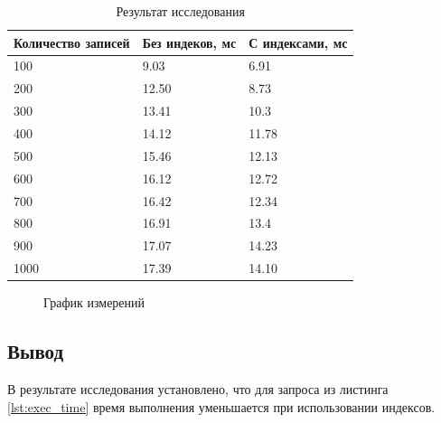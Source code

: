 \begin{table}[ht!]
	\centering
	\caption{Результат исследования}
	\label{tab:measure}
	\begin{tabular}{|p{4cm}|p{5cm}|p{5cm}|}
		\hline
		\textbf{Количество записей} & \textbf{Без индеков, мс} & \textbf{С индексами, мс} \\
		\hline
		100 & 9.03 & 6.91 \\
		\hline
		200 & 12.50 & 8.73 \\
		\hline
		300 & 13.41 & 10.3 \\
		\hline
		400 & 14.12 & 11.78 \\
		\hline
		500 & 15.46 & 12.13 \\
		\hline
		600 & 16.12 & 12.72 \\
		\hline
		700 & 16.42 & 12.34 \\
		\hline
		800 & 16.91 & 13.4 \\
		\hline
		900 & 17.07 & 14.23 \\
		\hline
		1000 & 17.39 & 14.10 \\
		\hline
	\end{tabular}
\end{table}

\begin{figure}[h!]
	\caption{График измерений}
	\label{fig:graph}
\end{figure}

\subsection{Вывод}

В результате исследования установлено, что для запроса из листинга \ref{lst:exec_time} время выполнения уменьшается при использовании индексов.

\pagebreak